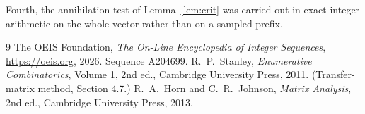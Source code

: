 \documentclass[11pt,a4paper]{article}
\theoremstyle{plain}
\theoremstyle{definition}
\begin{document}
Fourth, the annihilation test of Lemma~\ref{lem:crit} was carried out in exact integer
arithmetic on the whole vector rather than on a sampled prefix.

\begin{thebibliography}{9}
 The OEIS Foundation, \emph{The On-Line Encyclopedia of Integer
Sequences}, \url{https://oeis.org}, 2026. Sequence A204699.
 R.~P.~Stanley, \emph{Enumerative Combinatorics}, Volume 1, 2nd ed.,
Cambridge University Press, 2011. (Transfer-matrix method, Section 4.7.)
 R.~A.~Horn and C.~R.~Johnson, \emph{Matrix Analysis}, 2nd ed., Cambridge
University Press, 2013.
\end{thebibliography}
\end{document}
